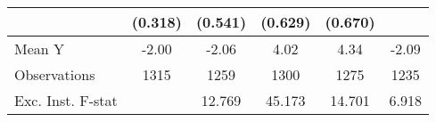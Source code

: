 {\begin{tabular}{l*{5}{c}}
            &     (0.318)         &     (0.541)         &     (0.629)         &     (0.670)         &                     \\
\midrule
Mean Y      &       -2.00         &       -2.06         &        4.02         &        4.34         &       -2.09         \\
Observations&        1315         &        1259         &        1300         &        1275         &        1235         \\
Exc. Inst. F-stat&                     &      12.769         &      45.173         &      14.701         &       6.918         \\
\bottomrule
\end{tabular}
}
